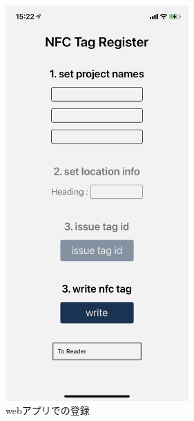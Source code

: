 \begin{figure}[h]
\begin{minipage}{0.5\hsize}
    \includegraphics[width=70mm]{images/nfc_register_mobile.png}
    \caption{webアプリでの登録} \label{fig:nfc_register_web}
  \end{minipage}
\end{figure}